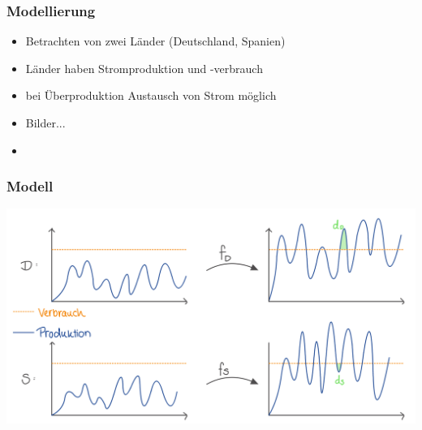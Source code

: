 \documentclass[aspectratio=169,t]{beamer}
\begin{document}
	
	\begin{frame}
		\frametitle{Modellierung}
		\vspace*{2mm}
		\begin{minipage}{1\linewidth}
			
				\begin{itemize}
					
					\item Betrachten von zwei Länder (Deutschland, Spanien)
					
					\item Länder haben Stromproduktion und -verbrauch
					
					\item bei Überproduktion Austausch von Strom möglich 
					
					\item Bilder...
					
					
					\item
				\end{itemize}
							
		
		\end{minipage}	
		
	\end{frame}


	\begin{frame}
		\frametitle{Modell}
		\vspace{-2mm}
		
		
		\begin{minipage}{.9\linewidth}
			\centering
			\includegraphics[width=.9\linewidth]{IMG_320.jpg}
			
		\end{minipage}
		
	\end{frame}
\end{document}
